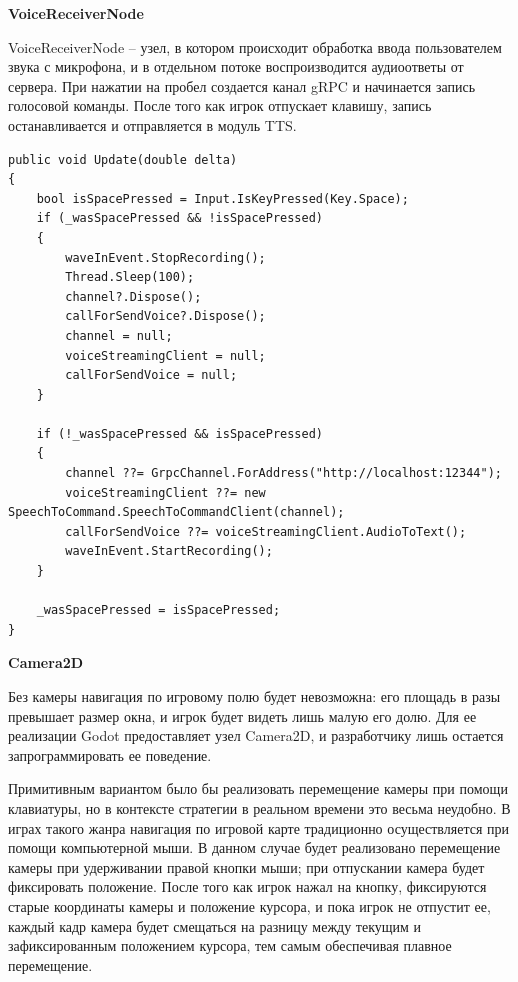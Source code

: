            \textbf{VoiceReceiverNode}

            VoiceReceiverNode -- узел, в котором происходит обработка ввода пользователем звука с микрофона, и в отдельном потоке воспроизводится аудиоответы от сервера. 
            При нажатии на пробел создается канал gRPC и начинается запись голосовой команды. После того как игрок отпускает клавишу, запись останавливается и отправляется в модуль TTS.
            \begin{lstlisting}[caption=Цикл обработки голосового ввода]
public void Update(double delta)
{
    bool isSpacePressed = Input.IsKeyPressed(Key.Space);
    if (_wasSpacePressed && !isSpacePressed)
    {
        waveInEvent.StopRecording();
        Thread.Sleep(100);
        channel?.Dispose();
        callForSendVoice?.Dispose();
        channel = null;
        voiceStreamingClient = null;
        callForSendVoice = null;
    }

    if (!_wasSpacePressed && isSpacePressed)
    {
        channel ??= GrpcChannel.ForAddress("http://localhost:12344");
        voiceStreamingClient ??= new SpeechToCommand.SpeechToCommandClient(channel);
        callForSendVoice ??= voiceStreamingClient.AudioToText();
        waveInEvent.StartRecording();
    }

    _wasSpacePressed = isSpacePressed;
}
            \end{lstlisting}
            
            \textbf{Camera2D}

            Без камеры навигация по игровому полю будет невозможна: его площадь в разы превышает размер окна, и игрок будет видеть лишь малую его долю.
            Для ее реализации Godot предоставляет узел Camera2D, и разработчику лишь остается запрограммировать ее поведение.

            Примитивным вариантом было бы реализовать перемещение камеры при помощи клавиатуры, но в контексте стратегии в реальном времени это весьма неудобно.
            В играх такого жанра навигация по игровой карте традиционно осуществляется при помощи компьютерной мыши. В данном случае будет реализовано перемещение камеры
            при удерживании правой кнопки мыши; при отпускании камера будет фиксировать положение. После того как игрок нажал на кнопку, фиксируются старые координаты
            камеры и положение курсора, и пока игрок не отпустит ее, каждый кадр камера будет смещаться на разницу между текущим и зафиксированным положением курсора,
            тем самым обеспечивая плавное перемещение.

